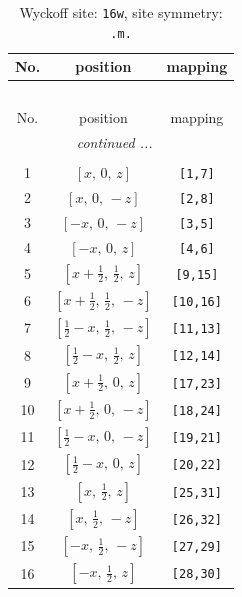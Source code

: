 \documentclass[fleqn,8pt]{jsarticle}
\begin{document}
\renewcommand{\arraystretch}{1.2}
\begin{longtable}{ccc}
\caption{Wyckoff site: {\tt 16w}, site symmetry: {\tt .m.}}
 \\
 \hline \hline
No. & position & mapping \\ \hline \endfirsthead

\multicolumn{2}{l}{\tablename\ \thetable{}} \\
 \hline \hline
No. & position & mapping \\ \hline \endhead

 \hline \hline
\multicolumn{2}{r}{\footnotesize\it continued ...} \\ \endfoot

 \hline \hline
\multicolumn{2}{r}{} \\ \endlastfoot

1 & $\left[ x,\, 0,\, z \right]$ & {\tt [1,7]} \\ \hline
2 & $\left[ x,\, 0,\, - z \right]$ & {\tt [2,8]} \\ \hline
3 & $\left[ - x,\, 0,\, - z \right]$ & {\tt [3,5]} \\ \hline
4 & $\left[ - x,\, 0,\, z \right]$ & {\tt [4,6]} \\ \hline
5 & $\left[ x + \frac{1}{2},\, \frac{1}{2},\, z \right]$ & {\tt [9,15]} \\ \hline
6 & $\left[ x + \frac{1}{2},\, \frac{1}{2},\, - z \right]$ & {\tt [10,16]} \\ \hline
7 & $\left[ \frac{1}{2} - x,\, \frac{1}{2},\, - z \right]$ & {\tt [11,13]} \\ \hline
8 & $\left[ \frac{1}{2} - x,\, \frac{1}{2},\, z \right]$ & {\tt [12,14]} \\ \hline
9 & $\left[ x + \frac{1}{2},\, 0,\, z \right]$ & {\tt [17,23]} \\ \hline
10 & $\left[ x + \frac{1}{2},\, 0,\, - z \right]$ & {\tt [18,24]} \\ \hline
11 & $\left[ \frac{1}{2} - x,\, 0,\, - z \right]$ & {\tt [19,21]} \\ \hline
12 & $\left[ \frac{1}{2} - x,\, 0,\, z \right]$ & {\tt [20,22]} \\ \hline
13 & $\left[ x,\, \frac{1}{2},\, z \right]$ & {\tt [25,31]} \\ \hline
14 & $\left[ x,\, \frac{1}{2},\, - z \right]$ & {\tt [26,32]} \\ \hline
15 & $\left[ - x,\, \frac{1}{2},\, - z \right]$ & {\tt [27,29]} \\ \hline
16 & $\left[ - x,\, \frac{1}{2},\, z \right]$ & {\tt [28,30]} \\
\end{longtable}
\end{document}
